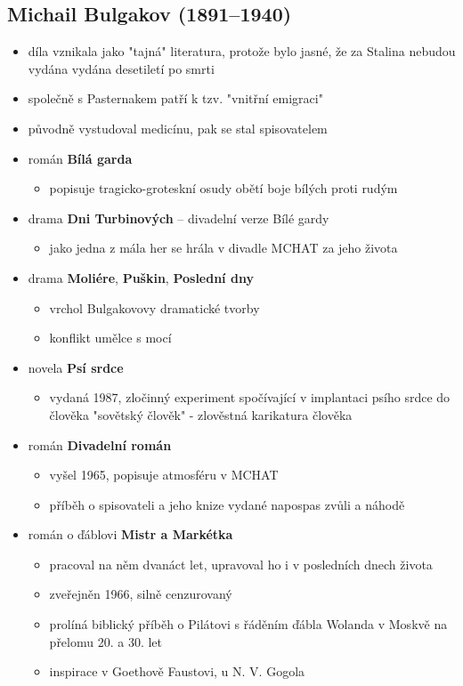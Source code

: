 \subsection{Michail Bulgakov (1891--1940)}
\begin{itemize}
\item díla vznikala jako "tajná" literatura, protože bylo jasné, že za Stalina nebudou vydána \ra vydána desetiletí po smrti 
\item společně s Pasternakem patří k tzv. "vnitřní emigraci"
\item původně vystudoval medicínu, pak se stal spisovatelem
\item román \textbf{Bílá garda}
	\begin{itemize}
	\item popisuje tragicko-groteskní osudy obětí boje bílých proti rudým
	\end{itemize}
\item drama \textbf{Dni Turbinových} -- divadelní verze Bílé gardy
	\begin{itemize}
	\item jako jedna z mála her se hrála v divadle MCHAT za jeho života
	\end{itemize}
\item drama \textbf{Moliére}, \textbf{Puškin}, \textbf{Poslední dny}
	\begin{itemize}
	\item vrchol Bulgakovovy dramatické tvorby
	\item konflikt umělce s mocí
	\end{itemize}
\item novela \textbf{Psí srdce}
	\begin{itemize}
	\item vydaná 1987, zločinný experiment spočívající v implantaci psího srdce do člověka \ra "sovětský člověk" - zlověstná karikatura člověka
	\end{itemize}
\item román \textbf{Divadelní román}
	\begin{itemize}
	\item vyšel 1965, popisuje atmosféru v MCHAT
	\item příběh o spisovateli a jeho knize vydané napospas zvůli a náhodě
	\end{itemize}
\item román o ďáblovi \textbf{Mistr a Markétka}
	\begin{itemize}
	\item pracoval na něm dvanáct let, upravoval ho i v posledních dnech života
	\item zveřejněn 1966, silně cenzurovaný
	\item prolíná biblický příběh o Pilátovi s řáděním ďábla Wolanda v Moskvě na přelomu 20. a 30. let
	\item inspirace v Goethově Faustovi, u N. V. Gogola
	\end{itemize}
\end{itemize}

